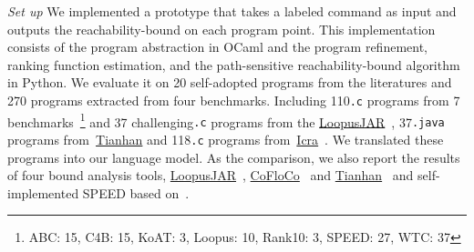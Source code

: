 \emph{Set up} We implemented a prototype {\THESYSTEM} that takes a labeled command as input 
and outputs the reachability-bound on each program point.
This implementation consists of the 
program abstraction in OCaml and the program refinement, ranking function estimation, and the path-sensitive reachability-bound algorithm in Python.
We evaluate it on 20 self-adopted programs from the literatures and 270 programs extracted from four benchmarks. 
Including 110{\tt .c} programs from 7 benchmarks~\cite{BenchmarkLoops}\footnote{ABC: 15, C4B: 15, KoAT: 3, Loopus: 10, Rank10: 3, SPEED: 27, WTC: 37} and 37 challenging{\tt .c} programs 
from the \hyperlink{https://forsyte.at/static/people/sinn/loopusJAR/index.html}{LoopusJAR}~\cite{BenchmarkLoops,SinnZV17},
37{\tt .java} programs from~\hyperlink{https://zenodo.org/record/5140586\#.Y5pBoC-B1QI}{Tianhan}\cite{BenchmarkTianhan,LuCT21}
and 118{\tt .c} programs from~\hyperlink{https://github.com/icra-team/icra}{Icra}~\cite{BenchmarkIcra,KincaidBCR19,CyphertBKR19}.
We translated these programs into our language model.
As the comparison, we also report the results of four bound analysis tools, 
\hyperlink{https://forsyte.at/software/loopus/}{LoopusJAR}~\cite{SinnZV17},
\hyperlink{https://github.com/aeflores/CoFloCo/tree/master/src}{CoFloCo}~\cite{ToolCofloco,Montoya17,Flores-Montoya16,Flores-MontoyaH14}
and \hyperlink{https://zenodo.org/record/5140586\#.Y5pBoC-B1QI}{Tianhan}~\cite{BenchmarkTianhan}
and self-implemented SPEED based on~\cite{GulwaniJK09}.

